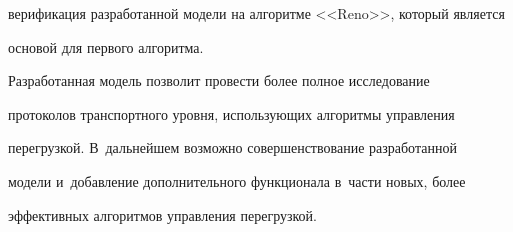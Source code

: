 верификация разработанной модели на алгоритме <<Reno>>, который является


основой для первого алгоритма.





  Разработанная модель позволит провести более полное исследование


протоколов транспортного уровня, использующих алгоритмы управления


перегрузкой. В~дальнейшем возможно совершенствование разработанной


модели и~добавление дополнительного функционала в~части новых, более


эффективных алгоритмов управления перегрузкой.





